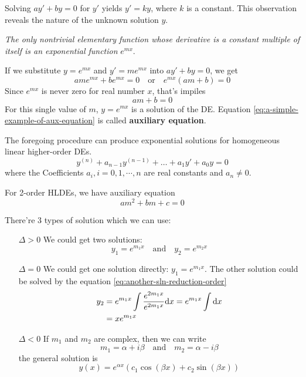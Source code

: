 \begin{example} \label{ex:introductory-example-one-order-homo-linear-DE}
    Solving $ay' + by = 0$ for $y'$ yields $y' = ky$, 
    where $k$ is a constant. This observation reveals
    the nature of the unknown solution $y$.

    \emph{The only nontrivial elementary function whose
    derivative is a constant multiple of itself is 
    an exponential function} $e^{mx}$.

    If we substitute $y = e^{mx}$ and $y' = me^{mx}$ into $ay' + by = 0$, 
    we get
    \[
        ame^{mx} + be^{mx} = 0 \quad \mbox{or} \quad e^{mx}(am + b) = 0
    \]
    Since $e^{mx}$ is never zero for real number $x$, that's impiles
    \begin{equation}\label{eq:a-simple-example-of-aux-equation}
        am + b = 0
    \end{equation}
    For this single value of $m$, $y = e^{mx}$ is a solution of the DE.
    Equation \ref{eq:a-simple-example-of-aux-equation} is called \textbf{auxiliary equation}.
\end{example}

The foregoing procedure can produce exponential solutions
for homogeneous linear higher-order DEs.
\begin{equation}\label{eq:standard-form-high-order-homogeneous-linear-DE}
    y^{(n)} + a_{n-1}y^{(n-1)} + \ldots + a_1y' + a_0y = 0
\end{equation}
where the Coefficients $a_i, i = 0, 1, \cdots, n$ are real constants
and $a_n \neq 0$.

For 2-order HLDEs, we have auxiliary equation
\[
    am^2 + bm + c = 0
\]

There're 3 types of solution which we can use:
\begin{itemize}
    \item[$\Delta > 0$] We could get two solutions: 
        \[
            y_1 = e^{m_1x} \quad \mbox{and} \quad y_2 = e^{m_2x}
        \]
    \item[$\Delta = 0$] We could get one solution directly: $y_1 = e^{m_1x}$.
        The other solution could be solved by the equation 
        \ref{eq:another-sln-reduction-order}
        \begin{align}\label{eq:complementary-func-sln-delta-0}
            y_2 &= e^{m_1 x} \int \dfrac{e^{2 m_1 x}}{e^{2 m_1 x}} \mathrm{d}x = e^{m_1 x} \int \mathrm{d}x \notag \\
                &= x e^{m_1 x}
        \end{align}
    \item[$\Delta < 0$]
        If $m_1$ and $m_2$ are complex, then we can write
        \[
            m_1 = \alpha + i \beta \quad \mbox{and} \quad m_2 = \alpha - i \beta
        \]
        the general solution is
        \begin{equation}
            y(x) = e^{\alpha x}(c_1 \cos(\beta x) + c_2 \sin(\beta x))
        \end{equation}
\end{itemize}

